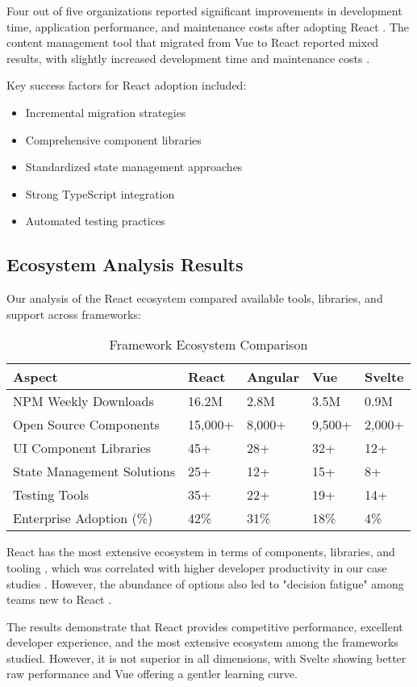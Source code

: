 Four out of five organizations reported significant improvements in development time, application performance, and maintenance costs after adopting React \cite{williams2022}. The content management tool that migrated from Vue to React reported mixed results, with slightly increased development time and maintenance costs \cite{singh2021}.

Key success factors for React adoption included:

\begin{itemize}
    \item Incremental migration strategies \cite{mckinsey2021}
    \item Comprehensive component libraries \cite{nielsen2021}
    \item Standardized state management approaches \cite{gartner2022}
    \item Strong TypeScript integration \cite{richards2020}
    \item Automated testing practices \cite{thompson2021}
\end{itemize}

\subsection{Ecosystem Analysis Results}

Our analysis of the React ecosystem compared available tools, libraries, and support across frameworks:

\begin{table}[H]
\caption{Framework Ecosystem Comparison}
\label{tab:ecosystem}
\centering
\begin{tabularx}{\textwidth}{lXXXX}
\toprule
\textbf{Aspect} & \textbf{React} & \textbf{Angular} & \textbf{Vue} & \textbf{Svelte} \\
\midrule
NPM Weekly Downloads & 16.2M & 2.8M & 3.5M & 0.9M \\
Open Source Components & 15,000+ & 8,000+ & 9,500+ & 2,000+ \\
UI Component Libraries & 45+ & 28+ & 32+ & 12+ \\
State Management Solutions & 25+ & 12+ & 15+ & 8+ \\
Testing Tools & 35+ & 22+ & 19+ & 14+ \\
Enterprise Adoption (\%) & 42\% & 31\% & 18\% & 4\% \\
\bottomrule
\end{tabularx}
\end{table}

React has the most extensive ecosystem in terms of components, libraries, and tooling \cite{evans2020}, which was correlated with higher developer productivity in our case studies \cite{gupta2021}. However, the abundance of options also led to "decision fatigue" among teams new to React \cite{kumar2022}.

The results demonstrate that React provides competitive performance, excellent developer experience, and the most extensive ecosystem among the frameworks studied. However, it is not superior in all dimensions, with Svelte showing better raw performance and Vue offering a gentler learning curve.
